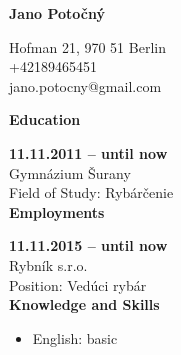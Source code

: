 \documentclass[12pt, a4paper]{article}
\begin{document}
        \begin{center} \huge \bfseries Jano Potočný\end{center}
Hofman 21, 970 51 Berlin\\
+42189465451\\
jano.potocny@gmail.com\\

{\hrulefill \large \bfseries Education\hrulefill}

\vspace{0.2cm}
{\bfseries 11.11.2011 -- until now}\\Gymnázium Šurany\\Field of Study: Rybárčenie\\

{\hrulefill \large \bfseries Employments\hrulefill}

\vspace{0.2cm}
{\bfseries 11.11.2015 -- until now}\\Rybník s.r.o.\\ Position: Vedúci rybár\\

{\hrulefill \large \bfseries Knowledge and Skills\hrulefill}

\vspace{0.2cm}{\bfseries Languages:}
    \begin{itemize}[leftmargin=0.5cm,topsep=0cm]
    \setlength\itemsep{-0.2cm}\item English: basic\end{itemize}
\end{document}
